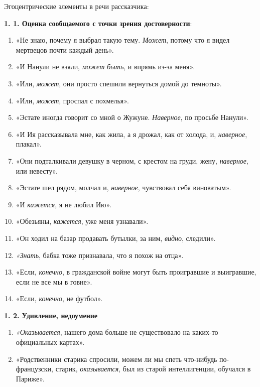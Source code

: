 \documentclass{kursa4}
\begin{document}
{{      Эгоцентрические элементы в речи
      рассказчика:

      {\par}

      \textbf{1. 1. Оценка сообщаемого с точки
      зрения достоверности}:
      \begin{enumerate}
        \item «Не знаю, почему я выбрал такую тему. \textit{Может}, потому что я
        видел мертвецов почти каждый день».
        \item «И Нанули не взяли, \textit{может быть}, и впрямь из-за меня».
        \item «Или, \textit{может}, они просто спешили вернуться домой до
        темноты».
        \item «Или, \textit{может}, проспал с похмелья».
        \item «Эстате иногда говорит со мной о Жужуне. \textit{Наверное}, по
        просьбе Нанули». 
        \item «И Ия рассказывала мне, как жила, а я дрожал, как от холода, и,
        \textit{наверное}, плакал».
        \item «Они подталкивали девушку в черном, с крестом на груди, жену,
        \textit{наверное}, или невесту». 
        \item «Эстате шел рядом, молчал и, \textit{наверное}, чувствовал себя
        виноватым».
        \item «И \textit{кажется}, я не любил Ию».
        \item «Обезьяны, \textit{кажется}, уже меня узнавали».
        \item «Он ходил на базар продавать бутылки, за ним, \textit{видно},
        следили».
        \item \textit{«Знать}, бабка тоже признавала, что я похож на отца».
        \item «Если, \textit{конечно}, в гражданской войне могут быть
        проигравшие и выигравшие, если не все мы в говне».
        \item «Если, \textit{конечно}, не футбол».
      \end{enumerate}

      \textbf{1. 2. Удивление, недоумение}
        \setcounter{saveenum}{\value{enumi}}
        \begin{enumerate}
        \setcounter{enumi}{\value{saveenum}}
        \item \textit{«Оказывается}, нашего дома больше не существовало на
        каких-то официальных картах».
        \item «Родственники старика спросили, можем ли мы спеть что-нибудь
        по-французски, старик, \textit{оказывается}, был из старой
        интеллигенции, обучался в Париже».
      \end{enumerate}

}}
\end{document}
